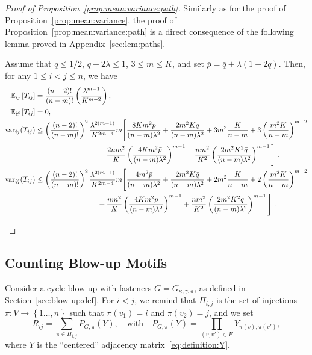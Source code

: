 \documentclass[final]{colt2026}
\newcommand{\1}{\mathbf{1}}
\newcommand{\bbE}{\mathbb{E}}
\newcommand{\pa}[1]{\left(#1\right)}
\newcommand{\ac}[1]{\left\{#1\right\}}
\newcommand{\cro}[1]{\left[#1\right]}
\begin{document}
\begin{proof}[Proof of Proposition~\ref{prop:mean:variance:path}]
Similarly as for the proof of Proposition~\ref{prop:mean:variance}, the proof of Proposition~\ref{prop:mean:variance:path} is a direct consequence of the following lemma proved in Appendix~\ref{sec:lem:paths}.
\begin{lemma}\label{lem:paths}
Assume that $q\leq 1/2$, $q+2\lambda \leq 1$, $3\leq m\leq K$, and set $\bar p=\bar q+\lambda(1-2q)$.
Then, for any $1\leq i< j\leq n$, we have 
\begin{align}
\bbE_{ij}\cro{T_{ij}}&={(n-2)!\over (n-m)!} \pa{\lambda^{m-1} \over K^{m-2}}, \label{eq:mean:12:path}\\
\bbE_{\not ij}\cro{T_{ij}}&= 0, \label{eq:mean:not12:path}\\ \nonumber
\mathrm{var}_{ij}(T_{ij}) & \leq \left(\frac{(n-2)!}{(n-m)!}\right)^2  \frac{\lambda^{2(m-1)}}{K^{2m-4}}m \Bigg[\frac{8Km^2 \bar p}{ (n-m) \lambda^2}+  \frac{2m^2K\bar{q}}{(n-m) \lambda^2} + 3m^2\frac{K}{n-m}+ 3\left(\frac{m^2 K}{n-m}\right)^{m-2}\\ &\hspace{3cm} +  \frac{2nm^2}{K} \left(\frac{4Km^2\bar p}{(n-m)\lambda^2}\right)^{m-1} + \frac{n m^2}{K^2}\left(\frac{2m^2K^2\bar{q}}{(n-m)\lambda^2} \right)^{m-1}
\Bigg] \ . 
 \label{eq:var:12:path}\\ \nonumber
 \mathrm{var}_{\not ij}(T_{ij}) & \leq  \left(\frac{(n-2)!}{(n-m)!}\right)^2 \frac{\lambda^{2(m-1)}}{K^{2m-4}}m \Bigg[\frac{4m^2 \bar p}{ (n-m) \lambda^2}+  \frac{2m^2K\bar{q}}{(n-m) \lambda^2} + 2m^2\frac{K}{n-m}+ 2\left(\frac{m^2 K}{n-m}\right)^{m-2}\\ &  \hspace{3cm}+ \frac{nm^2}{K} \left(\frac{4Km^2\bar p}{(n-m)\lambda^2}\right)^{m-1}+ \frac{n m^2}{K^2}\left(\frac{2m^2K^2\bar{q}}{(n-m)\lambda^2} \right)^{m-1}
\Bigg] \ . \label{eq:var:not12:path}
\end{align}
\end{lemma}

\end{proof}




\subsection{Counting Blow-up Motifs}\label{sec:blow-up-count}
Consider a cycle blow-up  with fasteners $G=G_{\kappa,\gamma , a }$, as defined in Section~\ref{sec:blow-up:def}. For $i< j$, we remind that $\Pi_{i,j}$ is the set of injections $\pi:V\to \ac{1\ldots,n}$ such that $\pi(v_{1})=i$ and $\pi(v_{2})=j$, and we set
\begin{equation}\label{eq:def:R}
R_{ij}=\sum_{\pi \in \Pi_{i,j}} P_{G,\pi}(Y),\quad \text{with}\quad P_{G,\pi}(Y)=\prod_{(v,v')\in E}Y_{\pi(v),\pi(v')},
\end{equation}
where $Y$ is the ``centered'' adjacency matrix~\eqref{eq:definition:Y}.
\end{document}
